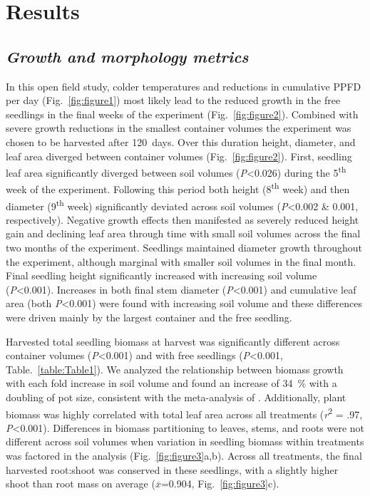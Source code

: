 \documentclass[a4paper]{article}\usepackage[]{graphicx}\usepackage[]{color}
\begin{document}
\section*{Results}

\subsection*{\textit{Growth and morphology metrics}}
In this open field study, colder temperatures and reductions in cumulative PPFD per day (Fig.~\ref{fig:figure1}) most likely lead to the reduced growth in the free seedlings in the final weeks of the experiment (Fig.~\ref{fig:figure2}).  Combined with severe growth reductions in the smallest container volumes the experiment was chosen to be harvested after 120~days. Over this duration height, diameter, and leaf area diverged between container volumes (Fig.~\ref{fig:figure2}).  First, seedling leaf area significantly diverged between soil volumes (\textit{P}\textless0.026) during the 5\textsuperscript{th} week of the experiment. Following this period both height (8\textsuperscript{th} week) and then diameter (9\textsuperscript{th} week) significantly deviated across soil volumes (\textit{P}\textless0.002 \& 0.001, respectively).  Negative growth effects then manifested as severely reduced height gain and declining leaf area through time with small soil volumes across the final two months of the experiment. Seedlings maintained diameter growth throughout the experiment, although marginal with smaller soil volumes in the final month. Final seedling height significantly increased with increasing soil volume (\textit{P}\textless0.001).  Increases in both final stem diameter (\textit{P}\textless0.001) and cumulative leaf area (both \textit{P}\textless0.001) were found with increasing soil volume and these differences were driven mainly by the largest container and the free seedling.

Harvested total seedling biomass at harvest was significantly different across container volumes (\textit{P}\textless0.001) and with free seedlings (\textit{P}\textless0.001, Table.~\ref{table:Table1}). We analyzed the relationship between biomass growth with each fold increase in soil volume and found an increase of 34~\% with a doubling of pot size, consistent with the meta-analysis of \citet{poorter2012pot}. Additionally, plant biomass was highly correlated with total leaf area across all treatments (\textit{r}\textsuperscript{2} = .97, \textit{P}\textless0.001). Differences in biomass partitioning to leaves, stems, and roots were not different across soil volumes when variation in seedling biomass within treatments was factored in the analysis (Fig.~\ref{fig:figure3}a,b). Across all treatments, the final harvested root:shoot was conserved in these seedlings, with a slightly higher shoot than root mass on average ($\overline{x}$=0.904, Fig.~\ref{fig:figure3}c).
\end{document}
